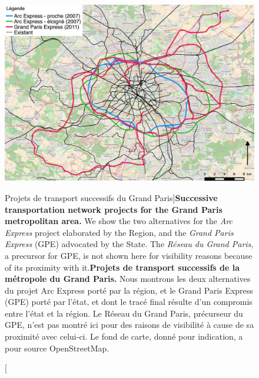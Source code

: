 \begin{figure}[h!]
\includegraphics[width=\linewidth]{Figures/Final/1-2-1-fig-casestudies-projects.jpg}
\caption[][Projets de transport successifs du Grand Paris]{\textbf{Successive transportation network projects for the Grand Paris metropolitan area.} We show the two alternatives for the \emph{Arc Express} project elaborated by the Region, and the \emph{Grand Paris Express} (GPE) advocated by the State. The \emph{Réseau du Grand Paris}, a precursor for GPE, is not shown here for visibility reasons because of its proximity with it.\label{fig:casestudies:projects}}{\textbf{Projets de transport successifs de la métropole du Grand Paris.} Nous montrons les deux alternatives du projet Arc Express porté par la région, et le Grand Paris Express (GPE) porté par l'état, et dont le tracé final résulte d'un compromis entre l'état et la région. Le Réseau du Grand Paris, précurseur du GPE, n'est pas montré ici pour des raisons de visibilité à cause de sa proximité avec celui-ci. Le fond de carte, donné pour indication, a pour source OpenStreetMap.\label{fig:casestudies:projects}}
\end{figure}




